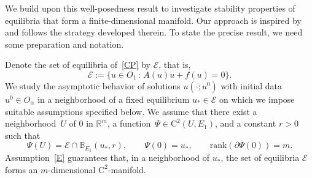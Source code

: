 \documentclass[reqno,11pt]{amsart}
\numberwithin{equation}{section}
\newcommand{\R}{\mathbb{R}}
\theoremstyle{remark}
\begin{document}
We build upon this well-posedness result to investigate stability properties of equilibria that form a finite-dimensional manifold. Our approach is inspired by \cite{PSZ9a} and follows the strategy developed therein.
To state the precise result, we need some preparation and notation.\medskip


Denote  the set of equilibria of~\eqref{CP} by $\mathcal{E}$, that is,
\[
\mathcal{E} := \{ u \in O_1 \,:\, A(u)u + f(u) = 0 \}.
\]
We study the asymptotic behavior of solutions $u(\cdot;u^0)$ with initial data $u^0 \in O_\alpha$
 in a neighborhood of a fixed equilibrium $u_* \in \mathcal{E}$ on which we impose suitable assumptions specified below.
We assume that there exist a neighborhood~$U$ of $0$ in $\R^m$, a function~${\Psi \in \mathrm{C}^2(U,E_1)}$, and a constant $r>0$ such that
\begin{equation}\label{E}
\Psi(U)= \mathcal{E}\cap \mathbb{B}_{E_1}(u_*,r),\qquad \Psi(0)=u_*,\qquad \mathrm{rank}(\partial \Psi(0))=m.
\end{equation}
Assumption~\eqref{E} guarantees that, in a neighborhood of $u_*$, the set of equilibria $\mathcal{E}$ forms an $m$-dimensional $\mathrm{C}^2$-manifold.
\end{document}
